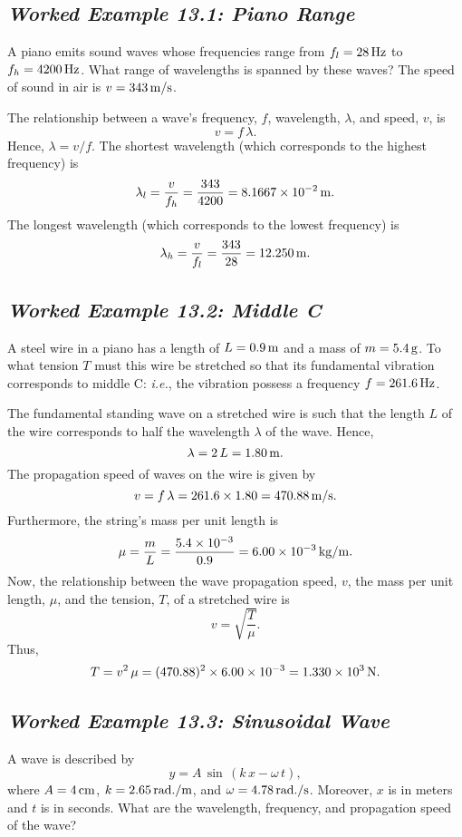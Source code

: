 \subsection*{\em Worked Example 13.1: Piano Range}
  A piano emits sound waves whose frequencies range from $f_l =28\, {\rm Hz}$ to
$f_h = 4200 \,{\rm Hz}$. What range of wavelengths is spanned by these waves? The speed of
sound in air is $v=343\,{\rm m/s}$. 

 The relationship between a wave's frequency, $f$, wavelength, $\lambda$,
and speed, $v$, is
$$
v = f\,\lambda.
$$
Hence, $\lambda=v/f$. The shortest wavelength (which corresponds to the highest
frequency) is 
$$
\lambda_l = \frac{v}{f_h} = \frac{343}{4200} = 8.1667\times 10^{-2}\,{\rm m}.
$$
The longest wavelength  (which corresponds to the lowest
frequency) is
$$
\lambda_h = \frac{v}{f_l} = \frac{343}{28} = 12.250\,{\rm m}.
$$

\subsection*{\em Worked Example 13.2: Middle C}
 A steel wire in a piano has a length of $L=0.9\,{\rm m}$
and a mass of $m= 5.4\,{\rm g}$. To what tension $T$ must this wire be
stretched so that its fundamental vibration corresponds to
middle C: {\em i.e.}, the vibration possess a frequency $f=261.6\,{\rm Hz}$. 

 The fundamental standing wave on a stretched wire is such that
the length $L$ of the wire corresponds to half the wavelength $\lambda$ of the wave.
Hence,
$$
\lambda = 2\,L = 1.80\,{\rm m}.
$$
The propagation speed of waves on the wire is given by
$$
v = f\,\lambda = 261.6\times 1.80= 470.88\,{\rm m/s}.
$$
Furthermore, the string's mass per unit length is
$$
\mu = \frac{m}{L} = \frac{5.4\times 10^{-3}}{0.9} = 6.00\times 10^{-3} \,{\rm kg/m}.
$$
Now, the relationship between the wave propagation speed, $v$, the mass per unit
length, $\mu$, and the tension, $T$, of a stretched wire is
$$
v = \sqrt{\frac{T}{\mu}}.
$$
Thus,
$$
T = v^2\,\mu  = (470.88)^2\times 6.00\times 10^{-3} = 1.330\times 10^3\,{\rm N}.
$$

\subsection*{\em Worked Example 13.3: Sinusoidal Wave}
 A wave is described by
$$
y = A\,\sin\,(k\,x-\omega\,t),
$$
where $A=4\,{\rm cm}$, $k=2.65\,{\rm rad./m}$, and  $\omega
=4.78\,{\rm rad./s}$. Moreover, $x$ is in meters and $t$ is
in seconds. What are the wavelength, frequency, and propagation
speed of the wave?

